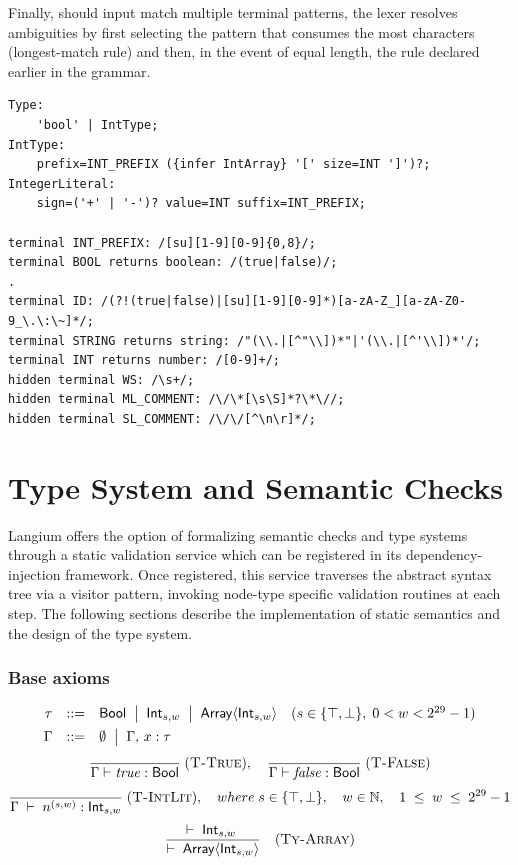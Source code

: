 Finally, should input match multiple terminal patterns, the lexer resolves ambiguities by first selecting the pattern that consumes the most characters (longest-match rule) and then, in the event of equal length, the rule declared earlier in the grammar.

\begin{verbatim}
Type:
    'bool' | IntType;
IntType:
    prefix=INT_PREFIX ({infer IntArray} '[' size=INT ']')?;
IntegerLiteral:
    sign=('+' | '-')? value=INT suffix=INT_PREFIX;

terminal INT_PREFIX: /[su][1-9][0-9]{0,8}/;
terminal BOOL returns boolean: /(true|false)/;
.
terminal ID: /(?!(true|false)|[su][1-9][0-9]*)[a-zA-Z_][a-zA-Z0-9_\.\:\~]*/;
terminal STRING returns string: /"(\\.|[^"\\])*"|'(\\.|[^'\\])*'/;
terminal INT returns number: /[0-9]+/;
hidden terminal WS: /\s+/;
hidden terminal ML_COMMENT: /\/\*[\s\S]*?\*\//;
hidden terminal SL_COMMENT: /\/\/[^\n\r]*/;
\end{verbatim}

\section{Type System and Semantic Checks}

Langium offers the option of formalizing semantic checks and type systems through a static validation service which can be registered in its dependency-injection framework.
Once registered, this service traverses the abstract syntax tree via a visitor pattern, invoking node-type specific validation routines at each step.
The following sections describe the implementation of static semantics and the design of the type system.

\subsubsection*{Base axioms}
\[
  \begin{array}{rcll}
    \tau   & ::=                                & \mathsf{Bool}
    \;\bigm|\; \mathsf{Int}_{s,w}
    \;\bigm|\; \mathsf{Array}\langle\mathsf{Int}_{s,w}\rangle
           & (s\in\{\top,\bot\},\;0<w<2^{29}-1)                 \\[1ex]
    \Gamma & ::=                                & \emptyset
    \;\bigm|\; \Gamma,\,x:\tau
  \end{array}
\]
\[
  \frac{}{\Gamma \vdash \mathit{true} : \mathsf{Bool}}
  \; (\textsc{T-True}), \quad
  \frac{}{\Gamma \vdash \mathit{false} : \mathsf{Bool}}
  \; (\textsc{T-False})
\]
\[
  \frac{}
  {\Gamma \;\vdash\; n^{(s,w)} : \mathsf{Int}_{s,w}}
  \; (\textsc{T-IntLit}), \quad
  where\;
  s \in \{\top, \bot\},
  \quad
  w \in \mathbb{N},
  \quad
  1 \;\le\; w \;\le\; 2^{29}-1
\]
\[
  \frac{\vdash\;\mathsf{Int}_{s,w}\;}
  {\vdash\;\mathsf{Array}\langle\mathsf{Int}_{s,w}\rangle}
  \quad(\textsc{Ty-Array})
\]


